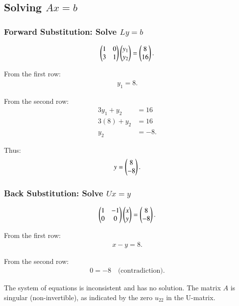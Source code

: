 \documentclass[journal,12pt,onecolumn]{IEEEtran}
\theoremstyle{remark}
\begin{document}
\subsection*{Solving $A{x} = {b}$}

\subsubsection*{Forward Substitution: Solve $Ly = b$}
\begin{align}
\begin{pmatrix}1 & 0 \\ 3 & 1\end{pmatrix}
\begin{pmatrix}y_1 \\ y_2\end{pmatrix}
=
\begin{pmatrix}8 \\ 16\end{pmatrix}.
\end{align}

From the first row:
\begin{align}
y_1 = 8.
\end{align}

From the second row:
\begin{align}
3y_1 + y_2 &= 16 \\
3(8) + y_2 &= 16 \\
y_2 &= -8.
\end{align}

Thus:
\begin{align}
{y} = \begin{pmatrix}8 \\ -8\end{pmatrix}.
\end{align}

\subsubsection*{Back Substitution: Solve $Ux = y$ }
\begin{align}
\begin{pmatrix}1 & -1 \\ 0 & 0\end{pmatrix}
\begin{pmatrix}x \\ y\end{pmatrix}
=
\begin{pmatrix}8 \\ -8\end{pmatrix}.
\end{align}

From the first row:
\begin{align}
x - y = 8.
\end{align}

From the second row:
\begin{align}
0 = -8 \quad \text{(contradiction)}.
\end{align}

The system of equations is inconsistent and has no solution. The matrix $A$ is singular (non-invertible), as indicated by the zero $u_{22}$ in the U-matrix.
\end{document}
